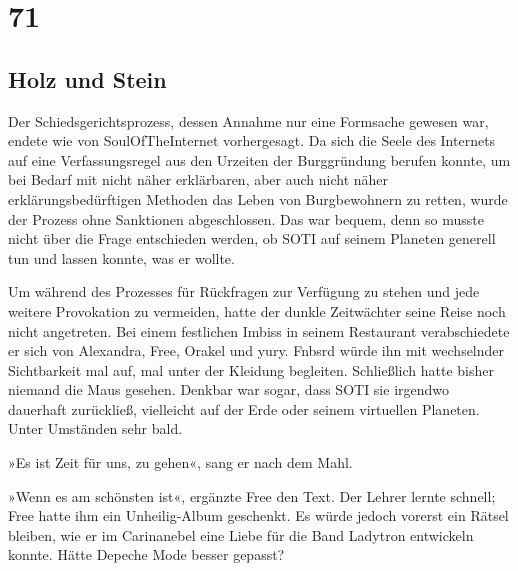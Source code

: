 \cleardoubleoddpage






\part{71}

\chapter{Holz und Stein}

Der Schiedsgerichtsprozess, dessen Annahme nur eine Formsache gewesen war, endete wie von SoulOfTheInternet vorhergesagt. Da sich die Seele des Internets auf eine Verfassungsregel aus den Urzeiten der Burggründung berufen konnte, um bei Bedarf mit nicht näher erklärbaren, aber auch nicht näher erklärungsbedürftigen Methoden das Leben von Burgbewohnern zu retten, wurde der Prozess ohne Sanktionen abgeschlossen. Das war bequem, denn so musste nicht über die Frage entschieden werden, ob SOTI auf seinem Planeten generell tun und lassen konnte, was er wollte.

Um während des Prozesses für Rückfragen zur Verfügung zu stehen und jede weitere Provokation zu vermeiden, hatte der dunkle Zeitwächter seine Reise noch nicht angetreten. Bei einem festlichen Imbiss in seinem Restaurant verabschiedete er sich von Alexandra, Free, Orakel und yury. Fnbsrd würde ihn mit wechselnder Sichtbarkeit mal auf, mal unter der Kleidung begleiten. Schließlich hatte bisher niemand die Maus gesehen. Denkbar war sogar, dass SOTI sie irgendwo dauerhaft zurückließ, vielleicht auf der Erde oder seinem virtuellen Planeten. Unter Umständen sehr bald.

»Es ist Zeit für uns, zu gehen«, sang er nach dem Mahl.

»Wenn es am schönsten ist«, ergänzte Free den Text. Der Lehrer lernte schnell; Free hatte ihm ein Unheilig-Album geschenkt. Es würde jedoch vorerst ein Rätsel bleiben, wie er im Carinanebel eine Liebe für die Band Ladytron entwickeln konnte. Hätte Depeche Mode besser gepasst?

